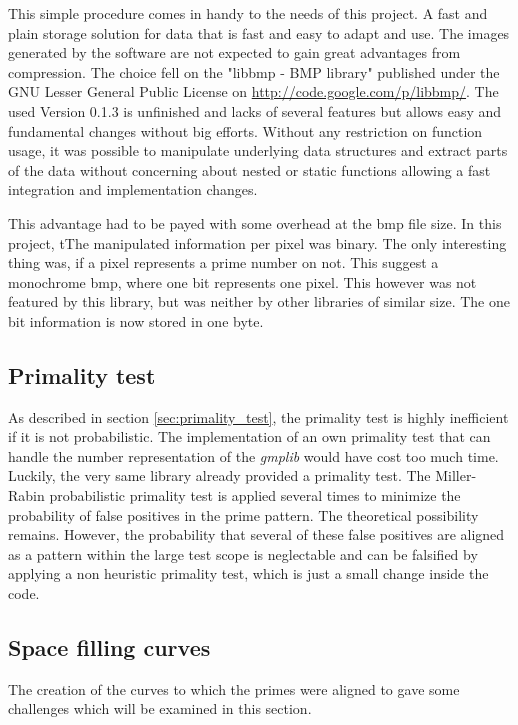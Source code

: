 This simple procedure comes in handy to the needs of this project. A fast and plain storage solution for data that is fast and easy to adapt and use. The images generated by the software are not expected to gain great advantages from compression. The choice fell on the "libbmp - BMP library" published under the GNU Lesser General Public License on \url{http://code.google.com/p/libbmp/}. The used Version 0.1.3 is unfinished and lacks of several features but allows easy and fundamental changes without big efforts. Without any restriction on function usage, it was possible to manipulate underlying data structures and extract parts of the data without concerning about nested or static functions allowing a fast integration and implementation changes.

This advantage had to be payed with some overhead at the bmp file size. In this project, tThe manipulated  information per pixel was binary. The only interesting thing was, if a pixel represents a prime number on not. This suggest a monochrome bmp, where one bit represents one pixel. This however was not featured by this library, but was neither by other libraries of similar size. The one bit information is now stored in one byte.

\subsection{Primality test}
\label{sec:prim_test}
As described in section \ref{sec:primality_test}, the primality test is highly inefficient if it is not probabilistic. The implementation of an own primality test that can handle the number representation of the \emph{gmplib} would have cost too much time. Luckily, the very same library already provided a primality test. The Miller-Rabin probabilistic primality test is applied several times to minimize the probability of false positives in the prime pattern. The theoretical possibility remains. However, the probability that several of these false positives are aligned as a pattern within the large test scope is neglectable and can be falsified by applying a non heuristic primality test, which is just a small change inside the code.

\subsection{Space filling curves}
\label{sec:curves}
The creation of the curves to which the primes were aligned to gave some challenges which will be examined in this section.
